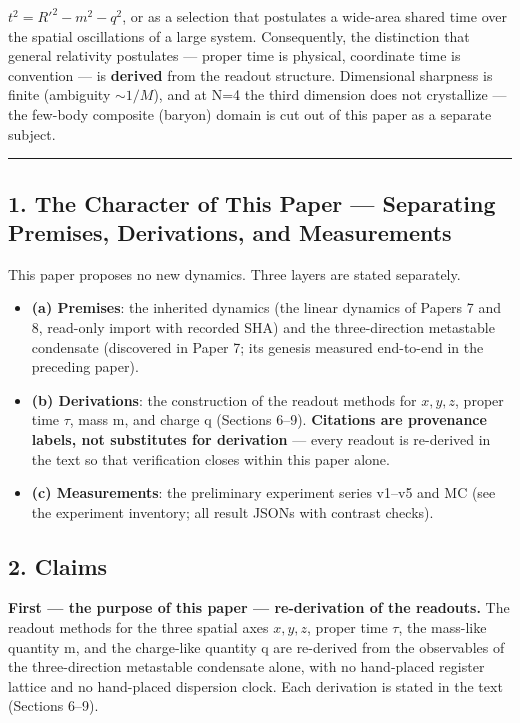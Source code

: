 \documentclass[
  a4paper,
]{article}
\providecommand{\tightlist}{%
  \setlength{\itemsep}{0pt}\setlength{\parskip}{0pt}}
\begin{document}
\(t^2 = R'^2 - m^2 - q^2\), or as a selection that postulates a
wide-area shared time over the spatial oscillations of a large system.
Consequently, the distinction that general relativity postulates ---
proper time is physical, coordinate time is convention --- is
\textbf{derived} from the readout structure. Dimensional sharpness is
finite (ambiguity \(\sim 1/M\)), and at N=4 the third dimension does not
crystallize --- the few-body composite (baryon) domain is cut out of
this paper as a separate subject.

\begin{center}\rule{0.5\linewidth}{0.5pt}\end{center}

\subsection{1. The Character of This Paper --- Separating Premises,
Derivations, and
Measurements}\label{the-character-of-this-paper-separating-premises-derivations-and-measurements}

This paper proposes no new dynamics. Three layers are stated separately.

\begin{itemize}
\tightlist
\item
  \textbf{(a) Premises}: the inherited dynamics (the linear dynamics of
  Papers 7 and 8, read-only import with recorded SHA) and the
  three-direction metastable condensate (discovered in Paper 7; its
  genesis measured end-to-end in the preceding paper).
\item
  \textbf{(b) Derivations}: the construction of the readout methods for
  \(x, y, z\), proper time \(\tau\), mass m, and charge q (Sections
  6--9). \textbf{Citations are provenance labels, not substitutes for
  derivation} --- every readout is re-derived in the text so that
  verification closes within this paper alone.
\item
  \textbf{(c) Measurements}: the preliminary experiment series v1--v5
  and MC (see the experiment inventory; all result JSONs with contrast
  checks).
\end{itemize}

\subsection{2. Claims}\label{claims}

\textbf{First --- the purpose of this paper --- re-derivation of the
readouts.} The readout methods for the three spatial axes \(x,y,z\),
proper time \(\tau\), the mass-like quantity m, and the charge-like
quantity q are re-derived from the observables of the three-direction
metastable condensate alone, with no hand-placed register lattice and no
hand-placed dispersion clock. Each derivation is stated in the text
(Sections 6--9).
\end{document}
